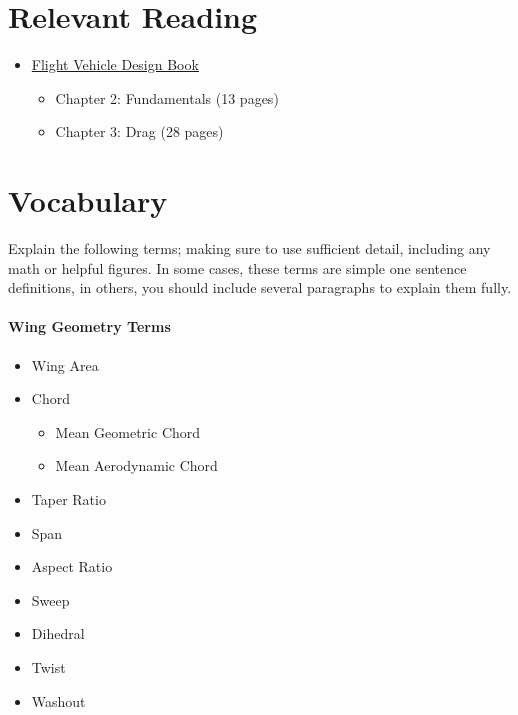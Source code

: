 \documentclass[11pt]{article}
\begin{document}
\section*{Relevant Reading}
\label{sec:reading}

\begin{itemize}
	\item \href{http://flowlab.groups.et.byu.net/me415/flight.pdf}{Flight Vehicle Design Book}
	\begin{itemize}
		\item Chapter 2: Fundamentals (13 pages)
		\item Chapter 3: Drag (28 pages)
	\end{itemize}

\end{itemize}





\section{Vocabulary}
\label{sec:vocab}

Explain the following terms; making sure to use sufficient detail, including any math or helpful figures.
In some cases, these terms are simple one sentence definitions, in others, you should include several paragraphs to explain them fully.

\paragraph{Wing Geometry Terms}
\begin{itemize}
	\item Wing Area
	\item Chord
	\begin{itemize}
		\item Mean Geometric Chord
		\item Mean Aerodynamic Chord
	\end{itemize}
	\item Taper Ratio
	\item Span
	\item Aspect Ratio
	\item Sweep
	\item Dihedral
	\item Twist
	\item Washout
\end{itemize}
\end{document}
